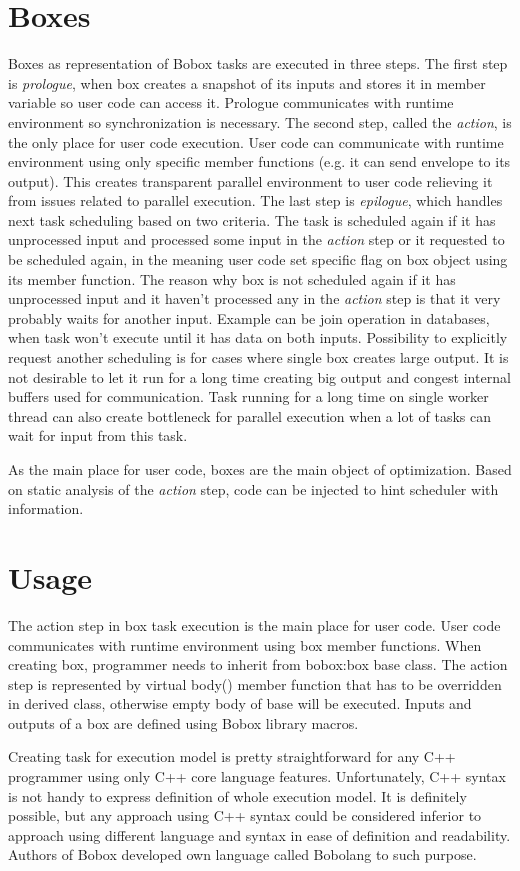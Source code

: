 \section{Boxes}
Boxes as representation of Bobox tasks are executed in three steps. The first step is \textit{prologue}, when box creates a snapshot of its inputs and stores it in member variable so user code can access it. Prologue communicates with runtime environment so synchronization is necessary. The second step, called the \textit{action}, is the only place for user code execution. User code can communicate with runtime environment using only specific member functions (e.g. it can send envelope to its output). This creates transparent parallel environment to user code relieving it from issues related to parallel execution. The last step is \textit{epilogue}, which handles next task scheduling based on two criteria. The task is scheduled again if it has unprocessed input and processed some input in the \textit{action} step or it requested to be scheduled again, in the meaning user code set specific flag on box object using its member function. The reason why box is not scheduled again if it has unprocessed input and it haven't processed any in the \textit{action} step is that it very probably waits for another input. Example can be join operation in databases, when task won't execute until it has data on both inputs. Possibility to explicitly request another scheduling is for cases where single box creates large output. It is not desirable to let it run for a long time creating big output and congest internal buffers used for communication. Task running for a long time on single worker thread can also create bottleneck for parallel execution when a lot of tasks can wait for input from this task.

As the main place for user code, boxes are the main object of optimization. Based on static analysis of the \textit{action} step, code can be injected to hint scheduler with information.

\section{Usage}
The action step in box task execution is the main place for user code. User code communicates with runtime environment using box member functions. When creating box, programmer needs to inherit from bobox:box base class. The action step is represented by virtual body() member function that has to be overridden in derived class, otherwise empty body of base will be executed. Inputs and outputs of a box are defined using Bobox library macros.

Creating task for execution model is pretty straightforward for any C++ programmer using only C++ core language features. Unfortunately, C++ syntax is not handy to express definition of whole execution model. It is definitely possible, but any approach using C++ syntax could be considered inferior to approach using different language and syntax in ease of definition and readability. Authors of Bobox developed own language called Bobolang to such purpose.
